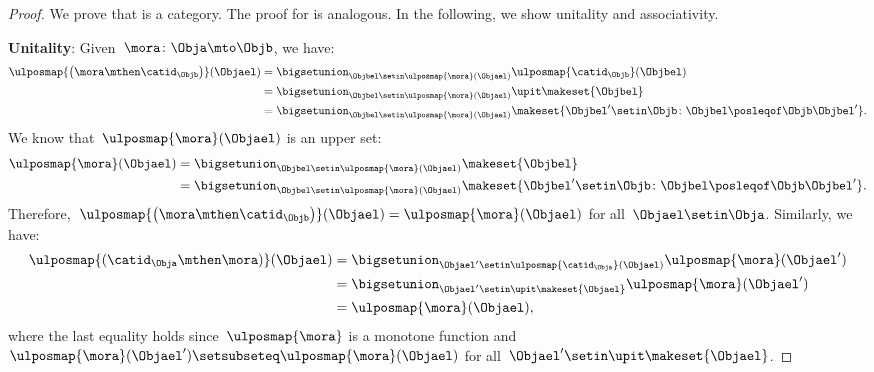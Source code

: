 \begin{proof}
    We prove that \UPos is a category.
    The proof for \LPos is analogous.
    In the following, we show unitality and associativity.

    \textbf{Unitality}:
    Given~$\mora\colon \Obja \mto \Objb$, we have:
    \begin{equation}
        \begin{aligned}
            \ulposmap{\left( \mora \mthen \catid_\Objb\right)}(\Objael) & =\bigsetunion_{\Objbel\setin \ulposmap{\mora}(\Objael)}\ulposmap{\catid_\Objb}(\Objbel) \\
                                                                        & =\bigsetunion_{\Objbel\setin \ulposmap{\mora}(\Objael)}\upit\makeset{\Objbel} \\
                                                                        & =\bigsetunion_{\Objbel\setin \ulposmap{\mora}(\Objael)}\makeset{\Objbel'\setin \Objb \colon \Objbel\posleqof\Objb \Objbel' }.
        \end{aligned}
    \end{equation}
    We know that~$\ulposmap{\mora}(\Objael)$ is an upper set:
    \begin{equation}
        \begin{aligned}
            \ulposmap{\mora}(\Objael) & =\bigsetunion_{\Objbel\setin \ulposmap{\mora}(\Objael)}\makeset{\Objbel} \\
                                      & =\bigsetunion_{\Objbel\setin \ulposmap{\mora}(\Objael)}\makeset{ \Objbel'\setin \Objb \colon \Objbel\posleqof\Objb \Objbel'}.
        \end{aligned}
    \end{equation}
    Therefore,~$\ulposmap{\left( \mora \mthen \catid_\Objb\right)}(\Objael)=\ulposmap{\mora}(\Objael)$ for all~$\Objael\setin \Obja$.
    Similarly, we have:
    \begin{equation}
        \begin{aligned}
            \ulposmap{(\catid_\Obja \mthen \mora)}(\Objael) & =\bigsetunion_{\Objael'\setin \ulposmap{\catid_\Obja}(\Objael)}\ulposmap{\mora}(\Objael') \\
                                                            & =\bigsetunion_{\Objael'\setin \upit \makeset{\Objael}}\ulposmap{\mora}(\Objael') \\
                                                            & =\ulposmap{\mora}(\Objael),
        \end{aligned}
    \end{equation}
    where the last equality holds since~$\ulposmap{\mora}$ is a monotone function and~$\ulposmap{\mora}(\Objael')\setsubseteq \ulposmap{\mora}(\Objael)$ for all~$\Objael'\setin \upit \makeset{\Objael}$.


\end{proof}
